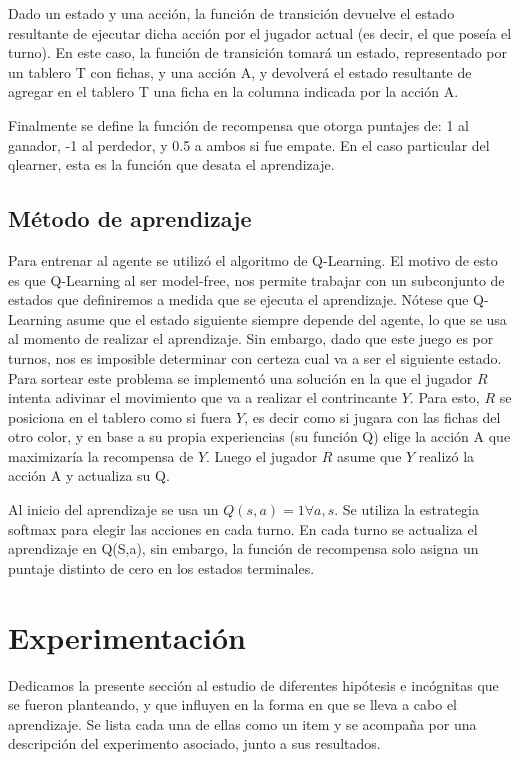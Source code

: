 \documentclass[10pt,a4paper]{article}
\begin{document}
Dado un estado y una acción, la función de transición devuelve el estado resultante de ejecutar dicha acción por el jugador actual (es decir, el que poseía el turno). En este caso, la función de transición tomará un estado, representado por un tablero T con fichas, y una acción A, y devolverá el estado resultante de agregar en el tablero T una ficha en la columna indicada por la acción A. %

Finalmente se define la función de recompensa que otorga puntajes de: 1 al ganador, -1 al perdedor, y 0.5 a ambos si fue empate. En el caso particular del qlearner, esta es la función que desata el aprendizaje.

\subsection{Método de aprendizaje}

Para entrenar al agente se utilizó el algoritmo de Q-Learning. El motivo de esto es que Q-Learning al ser model-free, nos permite trabajar con un subconjunto de estados que definiremos a medida que se ejecuta el aprendizaje. Nótese que Q-Learning asume que el estado siguiente siempre depende del agente, lo que se usa al momento de realizar el aprendizaje. Sin embargo, dado que este juego es por turnos, nos es imposible determinar con certeza cual va a ser el siguiente estado. Para sortear este problema se implementó una solución en la que el jugador $R$ intenta adivinar el movimiento que va a realizar el contrincante $Y$. Para esto, $R$ se posiciona en el tablero como si fuera $Y$, es decir como si jugara con las fichas del otro color, y en base a su propia experiencias (su función Q) elige la acción A que maximizaría la recompensa de $Y$. Luego el jugador $R$ asume que $Y$ realizó la acción A y actualiza su Q.

Al inicio del aprendizaje se usa un $Q(s,a) = 1 \forall a,s$. Se utiliza la estrategia softmax para elegir las acciones en cada turno. En cada turno se actualiza el aprendizaje en Q(S,a), sin embargo, la función de recompensa solo asigna un puntaje distinto de cero en los estados terminales.

\newpage
\section{Experimentación}
Dedicamos la presente sección al estudio de diferentes hipótesis e incógnitas que se fueron planteando, y que influyen en la forma en que se lleva a cabo el aprendizaje. Se lista cada una de ellas como un item y se acompaña por una descripción del experimento asociado, junto a sus resultados.
\end{document}
